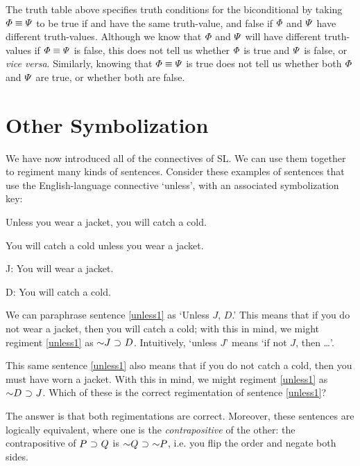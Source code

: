The truth table above specifies truth conditions for the biconditional by taking $\varPhi{} \equiv \varPsi{}$ to be true if \metaA{} and \metaB{} have the same truth-value, and false if $\varPhi{}$ and $\varPsi{}$ have different truth-values.
Although we know that $\varPhi{}$ and $\varPsi{}$ will have different truth-values if $\varPhi{} \equiv \varPsi{}$ is false, this does not tell us whether $\varPhi{}$ is true and $\varPsi{}$ is false, or \textit{vice versa}.
Similarly, knowing that $\varPhi \equiv \varPsi$ is true does not tell us whether both $\varPhi$ and $\varPsi$ are true, or whether both are false. 



\section{Other Symbolization}
We have now introduced all of the connectives of SL.
We can use them together to regiment many kinds of sentences.
Consider these examples of sentences that use the English-language connective `unless', with an associated symbolization key:

\begin{earg}
\item[\ex{unless1}] Unless you wear a jacket, you will catch a cold. 
\item[\ex{unless2}] You will catch a cold unless you wear a jacket. 
\end{earg}


\begin{ekey}
\item[J:] You will wear a jacket.
\item[D:] You will catch a cold.
\end{ekey}

We can paraphrase sentence \ref{unless1} as `Unless $J$, $D$.'
This means that if you do not wear a jacket, then you will catch a cold; with this in mind, we might regiment \ref{unless1} as $\enot J \eif D$.
Intuitively, `unless $J$' means `if not $J$, then \dots'. 

This same sentence \ref{unless1} also means that if you do not catch a cold, then you must have worn a jacket.
With this in mind, we might regiment \ref{unless1} as $\enot D \eif J$.
Which of these is the correct regimentation of sentence \ref{unless1}? 

The answer is that both regimentations are correct.
Moreover, these sentences are logically equivalent, where one is the \textit{contrapositive} of the other: the contrapositive of $P \mkern1mu\supset\mkern1mu Q$ is $\enot Q \eif \enot P$, i.e. you flip the order and negate both sides.

